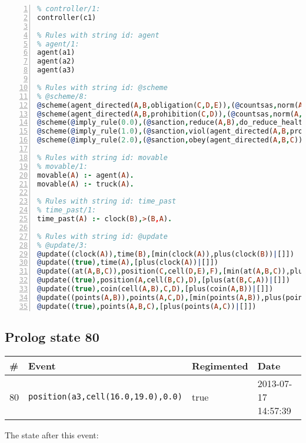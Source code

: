 \documentclass[11pt]{article}\usepackage[utf8]{inputenc}\usepackage{geometry}
\begin{document}
\begin{lstlisting}[language=Prolog, numbers=left]
% Rules with string id: controller
% controller/1:
controller(c1)

% Rules with string id: agent
% agent/1:
agent(a1)
agent(a2)
agent(a3)

% Rules with string id: @scheme
% @scheme/8:
@scheme(agent_directed(A,B,obligation(C,D,E)),(@countsas,norm(A,B,F,obligation(C,D,E)),F),false,(listTrue(C)),(time_past(D)),false,[plus(viol(agent_directed(A,B,obligation(C,D,E))))|[]],[plus(obey(agent_directed(A,B,obligation(C,D,E))))|[]])
@scheme(agent_directed(A,B,prohibition(C,D)),(@countsas,norm(A,B,E,prohibition(C,D)),E),(listTrue(C)),false,(false),false,[plus(viol(agent_directed(A,B,prohibition(C,D))))|[]],[plus(obey(agent_directed(A,B,prohibition(C,D))))|[]])
@scheme(@imply_rule(0.0),(@sanction,reduce(A,B),do_reduce_health(A,B),notifyAgent(A,changed(status))),true,false,false,false,[min(reduce(A,B))|[]],[])
@scheme(@imply_rule(1.0),(@sanction,viol(agent_directed(A,B,prohibition(C,D))),do_sanction(D)),true,false,false,false,[min(viol(agent_directed(A,B,prohibition(C,D))))|[]],[])
@scheme(@imply_rule(2.0),(@sanction,obey(agent_directed(A,B,C))),true,false,false,false,[min(obey(agent_directed(A,B,C)))|[]],[])

% Rules with string id: movable
% movable/1:
movable(A) :- agent(A).
movable(A) :- truck(A).

% Rules with string id: time_past
% time_past/1:
time_past(A) :- clock(B),>(B,A).

% Rules with string id: @update
% @update/3:
@update((clock(A)),time(B),[min(clock(A)),plus(clock(B))|[]])
@update((true),time(A),[plus(clock(A))|[]])
@update((at(A,B,C)),position(C,cell(D,E),F),[min(at(A,B,C)),plus(at(D,E,C))|[]])
@update((true),position(A,cell(B,C),D),[plus(at(B,C,A))|[]])
@update((true),coin(cell(A,B),C,D),[plus(coin(A,B))|[]])
@update((points(A,B)),points(A,C,D),[min(points(A,B)),plus(points(A,D))|[]])
@update((true),points(A,B,C),[plus(points(A,C))|[]])

\end{lstlisting}
\clearpage 
\subsection{Prolog state 80}
\begin{table}[ht]
\centering 
\begin{tabular}{l l l l} 
\textbf{\#} & \textbf{Event} & \textbf{Regimented} & \textbf{Date} \\ [0.5ex] 
\hline
80&\texttt{position(a3,cell(16.0,19.0),0.0)}&true&2013-07-17 14:57:39\\ [1ex] \hline\end{tabular}
\end{table}
The state after this event:
\end{document}

